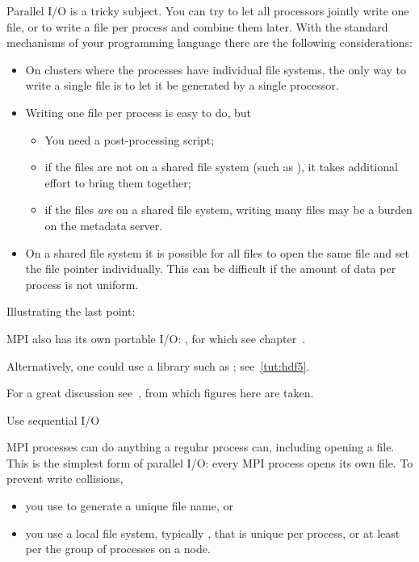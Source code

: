 
Parallel I/O is a tricky subject. You can try to let all processors
jointly write one file, or to write a file per process and combine
them later. With the standard mechanisms of your programming language
there are the following considerations:
\begin{itemize}
\item On clusters where the processes have individual file systems,
  the only way to write a single file is to let it be generated by a
  single processor.
\item Writing one file per process is easy to do, but
  \begin{itemize}
  \item You need a post-processing script;
  \item if the files are not on a shared file system (such as
    ), it takes additional effort to bring them
    together;
  \item if the files \emph{are} on a shared file system, writing many
    files may be a burden on the metadata server.
  \end{itemize}
\item On a shared file system it is possible for all files to open the
  same file and set the file pointer individually. This can be
  difficult if the amount of data per process is not uniform.
\end{itemize}
Illustrating the last point:

MPI also has its own portable I/O: , for which
see chapter~.

Alternatively, one could use a library such as ;
see~\ref{tut:hdf5}.

For a great discussion see~\cite{Mendez:ParallelIOpage},
from which figures here are taken.

 {Use sequential I/O}

MPI processes can do anything a regular process can,
including opening a file.
This is the simplest form of parallel I/O:
every MPI process opens its own file.
To prevent write collisions,
\begin{itemize}
\item you use  to generate a unique file name, or
\item you use a local file system, typically , that is unique
  per process, or at least per the group of processes on a node.
\end{itemize}


